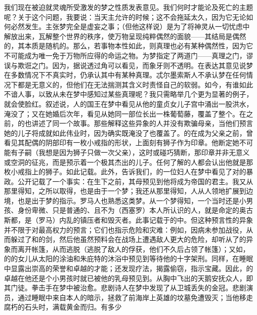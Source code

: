 我们现在被迫就灵魂所受激发的梦之性质发表意见。我们何时才能论及死亡的主题呢？关于这个问题，我要说：当天主允许的时候；这不会拖延太久，因为它无论如何必然发生。主张梦完全是虚妄之事；（但他这样说）是为了将神灵从一切忧虑中解放出来，瓦解整个世界的秩序，使万物呈现纯粹偶然的面貌——其结局是偶然的，其本质是随机的。那么，若事物本性如此，则真理也必有某种偶然性，因为它不可能成为唯一免于万物所应得的命运之物。为梦指定了两道门——真理之门，谬误与欺诳之门。因为，据说透过角可以看见，而象牙则不透明。在表达其意见说梦在多数情况下不真实时，仍承认其中有某种真理。忒尔墨索斯人不承认梦在任何情况下都是无意义的，但他们在无法揣测其含义时责怪自己的软弱。如今，有谁如此不谙人事，以致从未在梦中感知过某些真理呢？我只需略举几个更为显著的例子，就会使脸红。叙述说，人的国王在梦中看见从他的童贞女儿子宫中涌出一股洪水，淹没了；又在她婚后次年，看见从她同一部位长出一株葡萄藤，覆盖了整个。在之前，的也讲述了同一个故事。那些解释这些异象的人并没有欺骗母亲，当他们预言她的儿子将成就如此伟业时，因为确实既淹没了也覆盖了。的在成为父亲之前，曾看见其配偶的阴部印有一枚小戒指的形状，上面刻有狮子作为印章。他断定她不可能有子嗣（我想是因为狮子只做一次父亲），这时或碰巧猜断，那印章并非无意义或空洞的征兆，而是预示着一个极其杰出的儿子。任何了解的人都会认出他就是那枚小戒指上的狮子。如此记载。此外，告诉我们，的一位妇人在梦中看见了对的暴政。公开记载了一个事实：在生下之前，其母预见到他将成为帝国的君主。我又从那里得知，之所以取得，也是由于一个梦；我还从那里得知，人从人领地扩展到边境，也是出于梦的指示。罗马人也熟悉这类梦。从一个梦得知，一个当时还是小男孩、身份卑微、只是普通的、且不为（西塞罗）本人所认识的人，就是命定的奥古斯都，是（罗马）内乱的镇压者和毁灭者。此事记载于的中。但这种预言性的异象并不限于对最高权力的预言；它们也指示危险和灾难：例如，因病未参加战役，从而躲过了和的剑，然后他虽然预料会在战场上遭遇敌人更大的危险，却听从了的异象而离开帐篷，从而逃脱（逃脱了敌人的俘获，他们不久后占领了帐篷）；又如，的的女儿从太阳的涂油和朱庇特的沐浴中预见到等待他的十字架刑。同样，在睡眠中显露出崇高的荣誉和卓越的才能；还发现疗法，揭露偷窃，指示宝藏。因此，的卓越在他还是个小男孩时就已被他的乳母预见到。从胸中飞出的天鹅安抚众人，即其门徒。拳击手在梦中被治愈。悲剧诗人在梦中发现了从卫城丢失的金冠。悲剧演员，通过睡眠中来自本人的暗示，拯救了前海岸上英雄的坟墓免遭毁灭；当他移走腐朽的石头时，满载黄金而归。有多少